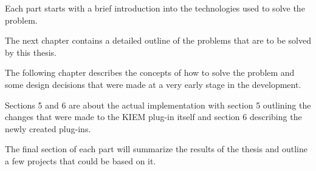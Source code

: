 Each part starts with a brief introduction into the technologies used to solve the problem.

The next chapter contains a detailed outline of the problems that are to be solved by this thesis.

The following chapter describes the concepts of how to solve the problem and some
design decisions that were made at a very early stage in the development.

Sections 5 and 6 are about the actual implementation with section 5 outlining the changes
that were made to the \ac{KIEM} plug-in itself and section 6 describing the newly created plug-ins.

The final section of each part will summarize the results of the thesis and outline
a few projects that could be based on it.









